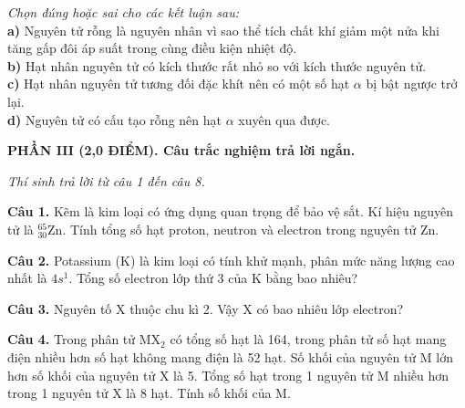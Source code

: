 \documentclass[13pt,a4paper]{article}
\begin{document}
\textit{Chọn đúng hoặc sai cho các kết luận sau:}\\
\textbf{a)} Nguyên tử rỗng là nguyên nhân vì sao thể tích chất khí giảm một nửa khi tăng gấp đôi áp suất trong cùng điều kiện nhiệt độ.\\

\textbf{b)} Hạt nhân nguyên tử có kích thước rất nhỏ so với kích thước nguyên tử.\\

\textbf{c)} Hạt nhân nguyên tử tương đối đặc khít nên có một số hạt $\alpha$ bị bật ngược trở lại.\\

\textbf{d)} Nguyên tử có cấu tạo rỗng nên hạt $\alpha$ xuyên qua được.\\
\vspace{2.0cm}

\vspace{6pt}
{\color{myGreen}\bfseries\large PHẦN III (2,0 ĐIỂM). Câu trắc nghiệm trả lời ngắn.}

\textit{\small Thí sinh trả lời từ câu 1 đến câu 8.}
\vspace{3pt}

\textbf{Câu 1.} Kẽm là kim loại có ứng dụng quan trọng để bảo vệ sắt. Kí hiệu nguyên tử là $^{65}_{30}\text{Zn}$. Tính tổng số hạt proton, neutron và electron trong nguyên tử Zn.\\
\vspace{1.8cm}

\textbf{Câu 2.} Potassium (K) là kim loại có tính khử mạnh, phân mức năng lượng cao nhất là $4s^1$. Tổng số electron lớp thứ 3 của K bằng bao nhiêu?\\
\vspace{1.8cm}

\textbf{Câu 3.} Nguyên tố X thuộc chu kì 2. Vậy X có bao nhiêu lớp electron?\\
\vspace{1.8cm}

\textbf{Câu 4.} Trong phân tử $\text{MX}_2$ có tổng số hạt là 164, trong phân tử số hạt mang điện nhiều hơn số hạt không mang điện là 52 hạt. Số khối của nguyên tử M lớn hơn số khối của nguyên tử X là 5. Tổng số hạt trong 1 nguyên tử M nhiều hơn trong 1 nguyên tử X là 8 hạt. Tính số khối của M.\\
\vspace{2.0cm}
\end{document}
